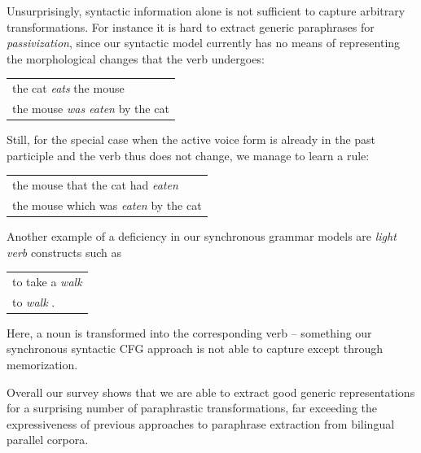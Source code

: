 \documentclass[11pt]{article}
\begin{document}
Unsurprisingly, syntactic information alone is not sufficient to
capture arbitrary transformations. For instance it is hard to extract
generic paraphrases for \emph{passivization}, since our syntactic
model currently has no means of representing the morphological changes that the
verb undergoes:
\begin{center}
\begin{tabular}{l}
  the cat \emph{eats} the mouse \\
  the mouse \emph{was eaten} by the cat \\
\end{tabular}
\end{center}
Still, for the special case when the active voice form is already in
the past participle and the verb thus does not change, we manage to
learn a rule:
\begin{center}
\begin{tabular}{l}
  the mouse that the cat had \emph{eaten} \\
  the mouse which was \emph{eaten} by the cat \\
\end{tabular}
\end{center}
%
Another example of a deficiency in our synchronous grammar models are
\emph{light verb} constructs such as
\begin{center}
\begin{tabular}{l}
  to take a \emph{walk} \\
  to \emph{walk} .
\end{tabular}
\end{center}
Here, a noun is transformed into the corresponding verb -- something
our synchronous syntactic CFG approach is not able to capture except
through memorization.

Overall our survey shows that we are able to extract good generic
representations for a surprising number of paraphrastic
transformations, far exceeding the expressiveness of previous
approaches to paraphrase extraction from bilingual parallel corpora.




\end{document}
